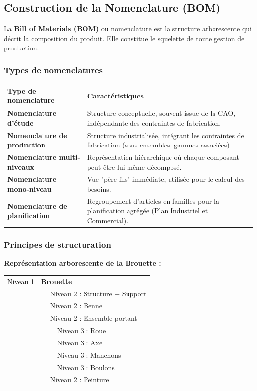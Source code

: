 \documentclass{article}
\begin{document}
\subsection{Construction de la Nomenclature (BOM)}

La \textbf{Bill of Materials (BOM)} ou nomenclature est la structure arborescente qui décrit la composition du produit. Elle constitue le squelette de toute gestion de production.

\subsubsection{Types de nomenclatures}

\begin{tabular}{|p{}|p{}|}
\hline
\textbf{Type de nomenclature} & \textbf{Caractéristiques} \\
\hline
\textbf{Nomenclature d'étude} & Structure conceptuelle, souvent issue de la CAO, indépendante des contraintes de fabrication. \\
\hline
\textbf{Nomenclature de production} & Structure industrialisée, intégrant les contraintes de fabrication (sous-ensembles, gammes associées). \\
\hline
\textbf{Nomenclature multi-niveaux} & Représentation hiérarchique où chaque composant peut être lui-même décomposé. \\
\hline
\textbf{Nomenclature mono-niveau} & Vue "père-fils" immédiate, utilisée pour le calcul des besoins. \\
\hline
\textbf{Nomenclature de planification} & Regroupement d'articles en familles pour la planification agrégée (Plan Industriel et Commercial). \\
\hline
\end{tabular}

\subsubsection{Principes de structuration}

\begin{center}
\begin{tcolorbox}[colback=white, colframe=blue!50!black, width=0.8\textwidth]
\textbf{Représentation arborescente de la Brouette :}
\vspace{0.5em}

\begin{tabular}{ll}
Niveau 1 & \textbf{Brouette} \\
& $\quad$ Niveau 2 : Structure + Support \\
& $\quad$ Niveau 2 : Benne \\
& $\quad$ Niveau 2 : Ensemble portant \\
& $\qquad$ Niveau 3 : Roue \\
& $\qquad$ Niveau 3 : Axe \\
& $\qquad$ Niveau 3 : Manchons \\
& $\qquad$ Niveau 3 : Boulons \\
& $\quad$ Niveau 2 : Peinture \\
\end{tabular}
\end{tcolorbox}
\end{center}
\end{document}

